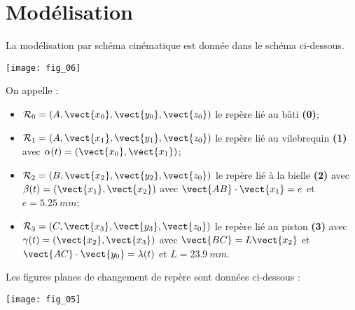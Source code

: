 \section*{Modélisation}
La modélisation par schéma cinématique est donnée dans le schéma ci-dessous. 
\begin{center}
\texttt{[image: fig\_06]}
\end{center}
On appelle : 
\begin{itemize}
\item $\mathcal{R}_0=\left(A,\vect{x_0},\vect{y_0},\vect{z_0} \right)$ le repère lié au bâti \textbf{(0)};
\item $\mathcal{R}_1=\left(A,\vect{x_1},\vect{y_1},\vect{z_0} \right)$ le repère lié au vilebrequin \textbf{(1)} avec $\alpha(t)=\left(\vect{x_0},\vect{x_1}\right)$;
\item $\mathcal{R}_2=\left(B,\vect{x_2},\vect{y_2},\vect{z_0} \right)$ le repère lié à la bielle \textbf{(2)} avec $\beta(t)=\left(\vect{x_1},\vect{x_2}\right)$ avec $\vect{AB}\cdot \vect{x_1}=e$ et $e=\SI{5,25}{mm}$;
\item $\mathcal{R}_3=\left(C,\vect{x_3},\vect{y_3},\vect{z_0} \right)$ le repère lié au piston \textbf{(3)} avec $\gamma(t)=\left(\vect{x_2},\vect{x_3}\right)$ avec $\vect{BC}=L\vect{x_2}$ et $\vect{AC}\cdot \vect{y_0}=\lambda(t)$ et $L=\SI{23,9}{mm}$.
\end{itemize}
Les figures planes de changement de repère sont données ci-dessous : 
\begin{center}
\texttt{[image: fig\_05]}
\end{center}




